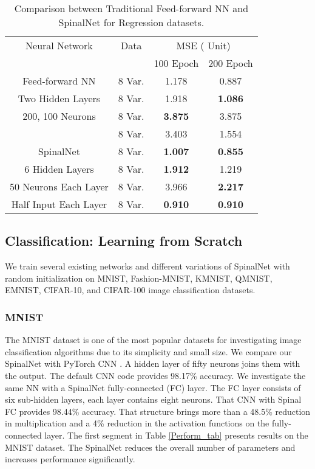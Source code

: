 \documentclass[journal]{IEEEtran}
\begin{document}
\begin{table}
\centering
\caption{Comparison between Traditional Feed-forward NN and SpinalNet for Regression datasets. }
\label{Regression1}
\begin{tabular}{|c|c|c|c|}
\hline
 Neural Network & Data & \multicolumn{2}{|c|}{MSE ( Unit)}    \\ \cline{3-4}
                &      & 100 Epoch & 200 Epoch    \\ \hline 
 Feed-forward NN & 8 Var.  & 1.178&0.887    \\ \cline{2-4} 
 Two Hidden Layers& 8 Var.  &1.918&\bf{1.086}    \\ \cline{2-4}  
 200, 100 Neurons & 8 Var.  & \bf{3.875} &3.875    \\ \cline{2-4} 
 \cite{Regression} & 8 Var.  &3.403 &1.554    \\ \hline 
 
 SpinalNet & 8 Var.  &\bf{1.007}& \bf{0.855}    \\ \cline{2-4} 
 6 Hidden Layers& 8 Var.  & \bf{1.912}&1.219    \\ \cline{2-4}  
 50 Neurons Each Layer & 8 Var.  &3.966 &\bf{2.217}    \\ \cline{2-4} 
 Half Input Each Layer & 8 Var.  & \bf{0.910} &\bf{0.910}    \\ \hline 
 
\end{tabular}
\end{table}

\subsection{Classification: Learning from Scratch}
We train several existing networks and different variations of SpinalNet with random initialization on MNIST, Fashion-MNIST, KMNIST, QMNIST, EMNIST, CIFAR-10, and CIFAR-100  image classification datasets.


\subsubsection{MNIST}
The MNIST dataset is one of the most popular datasets for investigating image classification algorithms due to its simplicity and small size. We compare our SpinalNet with PyTorch CNN \cite{MNIST_CNN}. A hidden layer of fifty neurons joins them with the output. The default CNN code provides 98.17\% accuracy. We investigate the same NN with a SpinalNet fully-connected (FC) layer. The FC layer consists of six sub-hidden layers, each layer contains eight neurons. That CNN with Spinal FC provides 98.44\% accuracy. That structure brings more than a 48.5\% reduction in multiplication and a 4\% reduction in the activation functions on the fully-connected layer. The first segment in Table \ref{Perform_tab} presents results on the MNIST dataset. The SpinalNet reduces the overall number of parameters and increases performance significantly. 
\end{document}

